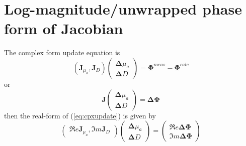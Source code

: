\documentclass{article}
\begin{document}
\section{Log-magnitude/unwrapped phase form of Jacobian}
The complex form update equation is
\begin{equation}
\left(\mathbf{J}_{\mu_a},\mathbf{J}_{D}\right)\left(
\begin{array}{l}
\boldsymbol{\Delta}{\mu_a}\\
\boldsymbol{\Delta}{D}
\end{array}
\right)=\boldsymbol{\Phi}^{meas}-\boldsymbol{\Phi}^{calc}
\end{equation}
or
\begin{equation}
\label{eq:cpxupdate} \mathbf{J}\left(
\begin{array}{l}
\boldsymbol{\Delta}{\mu_a}\\
\boldsymbol{\Delta}{D}
\end{array}
\right)=\boldsymbol{\Delta}\boldsymbol{\Phi}
\end{equation}
then the real-form of (\ref{eq:cpxupdate}) is given by
\begin{equation}
\label{eq:realupdate}\left(
\begin{array}{l}
\Re e{\mathbf{J}}_{\mu_a}, \Im m{\mathbf{J}}_{D}
\end{array}\right)
\left(
\begin{array}{l}
\boldsymbol{\Delta}{\mu_a}\\
\boldsymbol{\Delta}{D}
\end{array}
\right)=\left(
\begin{array}{l}
\Re e{\boldsymbol{\Delta\Phi}}\\
\Im m{\boldsymbol{\Delta\Phi}}
\end{array}\right)
\end{equation}
\end{document}
